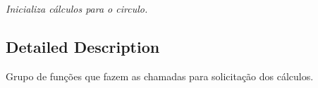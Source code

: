 \begin{DoxyCompactItemize}
\begin{DoxyCompactList}\small\item\em Inicializa cálculos para o circulo. \end{DoxyCompactList}\end{DoxyCompactItemize}


\subsection{Detailed Description}
Grupo de funções que fazem as chamadas para solicitação dos cálculos. 

